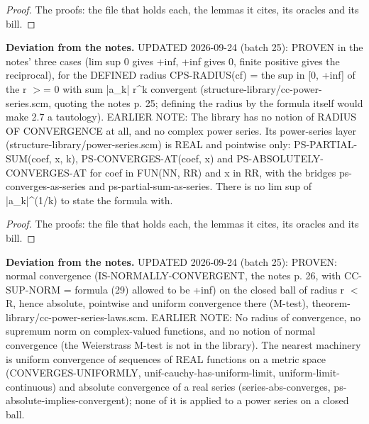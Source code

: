 %
\renewcommand{\thethm}{2.7}
\begin{prop}\label{thm:cps-radius-formula}
%
%
\end{prop}
%
\begin{proof}
%
The proofs: the file that holds each, the lemmas it cites, its oracles and its bill.
%
%
\end{proof}
%
\noindent\textbf{Deviation from the notes.} UPDATED 2026-09-24 (batch 25): PROVEN in the notes' three cases (lim sup 0 gives +inf, +inf gives 0, finite positive gives the reciprocal), for the DEFINED radius CPS-RADIUS(cf) = the sup in [0, +inf] of the r $>$= 0 with sum |a\_k| r\textasciicircum{}k convergent (structure-library/cc-power-series.scm, quoting the notes p. 25; defining the radius by the formula itself would make 2.7 a tautology). EARLIER NOTE: The library has no notion of RADIUS OF CONVERGENCE at all, and no complex power series. Its power-series layer (structure-library/power-series.scm) is REAL and pointwise only: PS-PARTIAL-SUM(coef, x, k), PS-CONVERGES-AT(coef, x) and PS-ABSOLUTELY-CONVERGES-AT for coef in FUN(NN, RR) and x in RR, with the bridges ps-converges-as-series and ps-partial-sum-as-series. There is no lim sup of |a\_k|\textasciicircum{}(1/k) to state the formula with.
%
\renewcommand{\thethm}{2.8}
\begin{lem}\label{thm:cps-normally-convergent-inside}
%
\leavevmode
{}
%
\end{lem}
%
\begin{proof}
%
The proofs: the file that holds each, the lemmas it cites, its oracles and its bill.
%
%
%
%
%
\end{proof}
%
\noindent\textbf{Deviation from the notes.} UPDATED 2026-09-24 (batch 25): PROVEN: normal convergence (IS-NORMALLY-CONVERGENT, the notes p. 26, with CC-SUP-NORM = formula (29) allowed to be +inf) on the closed ball of radius r $<$ R, hence absolute, pointwise and uniform convergence there (M-test), theorem-library/cc-power-series-laws.scm. EARLIER NOTE: No radius of convergence, no supremum norm on complex-valued functions, and no notion of normal convergence (the Weierstrass M-test is not in the library). The nearest machinery is uniform convergence of sequences of REAL functions on a metric space (CONVERGES-UNIFORMLY, unif-cauchy-has-uniform-limit, uniform-limit-continuous) and absolute convergence of a real series (series-abs-converges, ps-absolute-implies-convergent); none of it is applied to a power series on a closed ball.
